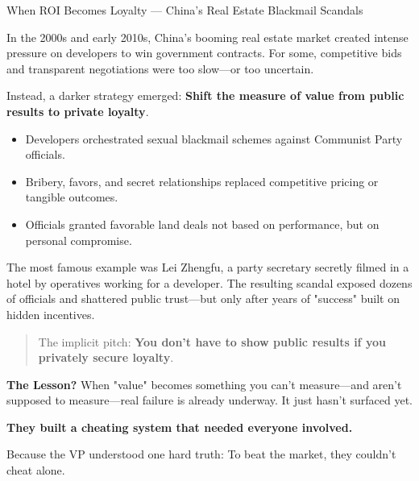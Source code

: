 \begin{HistoricalSidebar}{When ROI Becomes Loyalty --- China's Real Estate Blackmail Scandals}

    In the 2000s and early 2010s, China's booming real estate market created intense pressure on developers to win government contracts.  
    For some, competitive bids and transparent negotiations were too slow—or too uncertain.
    
    \medskip
    
    Instead, a darker strategy emerged:  
    \textbf{Shift the measure of value from public results to private loyalty}.
    
    \medskip
    
    \begin{itemize}
        \item Developers orchestrated sexual blackmail schemes against Communist Party officials.
        \item Bribery, favors, and secret relationships replaced competitive pricing or tangible outcomes.
        \item Officials granted favorable land deals not based on performance, but on personal compromise.
    \end{itemize}
    
    \medskip
    
    The most famous example was Lei Zhengfu, a party secretary secretly filmed in a hotel by operatives working for a developer.  
    The resulting scandal exposed dozens of officials and shattered public trust—but only after years of "success" built on hidden incentives.
    
    \medskip
    
    \begin{quote}
    The implicit pitch: \textbf{You don't have to show public results if you privately secure loyalty}.
    \end{quote}
    
    \medskip
    
    \textbf{The Lesson?} When "value" becomes something you can't measure—and aren't supposed to measure—real failure is already underway. It just hasn't surfaced yet.
\end{HistoricalSidebar}

\medskip


\textbf{They built a cheating system that needed everyone involved.}

Because the VP understood one hard truth: To beat the market, they couldn’t cheat alone.

